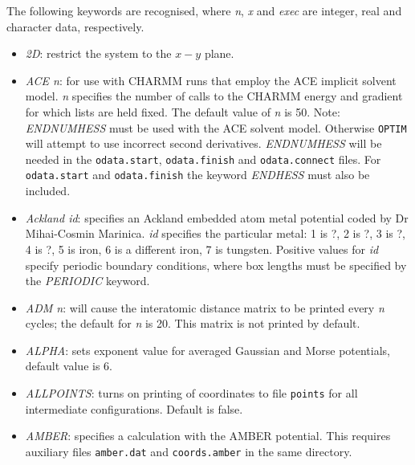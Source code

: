 \documentclass[12pt,a4paper,dvips]{article}
\begin{document}
The following keywords are recognised, where {\it n\/}, {\it x\/} and {\it exec\/} are integer,
real and character data, respectively.
\smallskip
\begin{itemize}
\item {\it 2D}: restrict the system to the $x-y$ plane.

\item {\it ACE n}: for use with CHARMM runs that employ the ACE implicit solvent model. 
{\it n} specifies the number of calls to the CHARMM energy and gradient for which lists
are held fixed. The default value of {\it n} is 50. 
Note: {\it ENDNUMHESS\/} must be used with the ACE solvent model. 
Otherwise {\tt OPTIM} will attempt to use incorrect second derivatives.
{\it ENDNUMHESS\/} will be needed in the {\tt odata.start}, {\tt odata.finish}
and {\tt odata.connect} files. 
For {\tt odata.start} and {\tt odata.finish} the keyword {\it ENDHESS}
must also be included.

\item {\it Ackland id\/}: specifies an Ackland embedded atom metal potential%
coded by Dr Mihai-Cosmin Marinica.
{\it id} specifies the particular metal: 1 is ?, 2 is ?, 3 is ?, 4 is ?, 5 is iron, 6 is a different iron,
7 is tungsten.
Positive values for {\it id} specify periodic boundary conditions, where box lengths must be
specified by the {\it PERIODIC\/} keyword. 

\item {\it ADM n}: will cause the
interatomic distance matrix to be printed every {\it n\/} cycles;
the default for {\it n\/} is 20. This matrix is not printed by default.

\item {\it ALPHA}: sets exponent value for averaged Gaussian and Morse potentials,
default value is 6.

\item {\it ALLPOINTS}: turns on printing of coordinates to file {\tt points} for
all intermediate configurations. Default is false.

\item {\it AMBER}: specifies a calculation with the AMBER potential. This requires
      auxiliary files {\tt amber.dat} and {\tt coords.amber} in the same directory.


\end{itemize}
\end{document}
